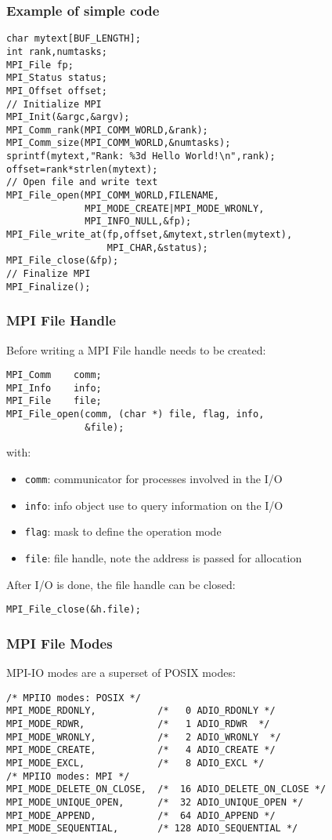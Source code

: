 \begin{frame}[fragile]

\frametitle{Example of simple code}
{\small
\begin{lstlisting}[style=c]
char mytext[BUF_LENGTH];
int rank,numtasks;
MPI_File fp;
MPI_Status status;
MPI_Offset offset;
// Initialize MPI
MPI_Init(&argc,&argv);
MPI_Comm_rank(MPI_COMM_WORLD,&rank);
MPI_Comm_size(MPI_COMM_WORLD,&numtasks);
sprintf(mytext,"Rank: %3d Hello World!\n",rank);
offset=rank*strlen(mytext);
// Open file and write text
MPI_File_open(MPI_COMM_WORLD,FILENAME,
              MPI_MODE_CREATE|MPI_MODE_WRONLY,
              MPI_INFO_NULL,&fp);
MPI_File_write_at(fp,offset,&mytext,strlen(mytext),
                  MPI_CHAR,&status);
MPI_File_close(&fp);
// Finalize MPI
MPI_Finalize();
\end{lstlisting}
}
\end{frame}

\begin{frame}[fragile]
\frametitle{MPI File Handle}

Before writing a MPI File handle needs to be created:
\begin{lstlisting}[style=c]
MPI_Comm    comm;
MPI_Info    info;
MPI_File    file;
MPI_File_open(comm, (char *) file, flag, info,
              &file);
\end{lstlisting}
with:
\begin{itemize}
\item \texttt{comm}: communicator for processes involved in the I/O
\item \texttt{info}: info object use to query information on the I/O
\item \texttt{flag}: mask to define the operation mode
\item \texttt{file}: file handle, note the address is passed for allocation
\end{itemize}

After I/O is done, the file handle can be closed:
\begin{lstlisting}[style=c]
MPI_File_close(&h.file);
\end{lstlisting}

\end{frame}

\begin{frame}[fragile]
\frametitle{MPI File Modes}

MPI-IO modes are a superset of POSIX modes:
{\small
\begin{lstlisting}[style=c]
/* MPIIO modes: POSIX */
MPI_MODE_RDONLY,           /*   0 ADIO_RDONLY */
MPI_MODE_RDWR,             /*   1 ADIO_RDWR  */
MPI_MODE_WRONLY,           /*   2 ADIO_WRONLY  */
MPI_MODE_CREATE,           /*   4 ADIO_CREATE */
MPI_MODE_EXCL,             /*   8 ADIO_EXCL */
/* MPIIO modes: MPI */
MPI_MODE_DELETE_ON_CLOSE,  /*  16 ADIO_DELETE_ON_CLOSE */
MPI_MODE_UNIQUE_OPEN,      /*  32 ADIO_UNIQUE_OPEN */
MPI_MODE_APPEND,           /*  64 ADIO_APPEND */
MPI_MODE_SEQUENTIAL,       /* 128 ADIO_SEQUENTIAL */
\end{lstlisting}
}
\end{frame}

